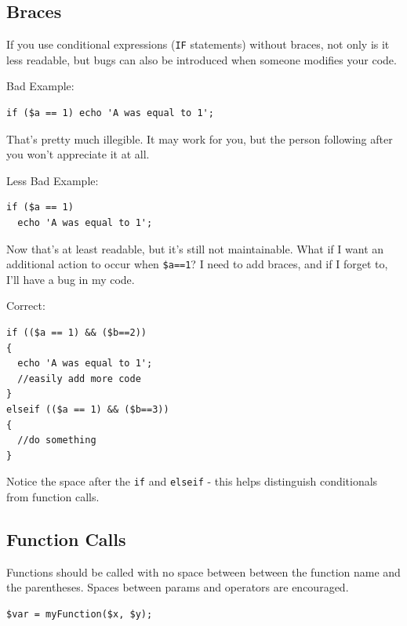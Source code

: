 \documentclass[headexclude,footexclude,12pt,BCOR0pt,DIV15]{scrartcl}
\begin{document}
    \subsection{Braces}
        If you use conditional expressions (\texttt{IF} statements) without braces, not only is it less readable,
        but bugs can also be introduced when someone modifies your code.
        \begin{description}
        \item{Bad Example:}
\begin{lstlisting}[stepnumber=0,frame={}]
if ($a == 1) echo 'A was equal to 1';
\end{lstlisting}

        That's pretty much illegible. It may work for you, but the person following after you won't appreciate it at all.

        \item{Less Bad Example:}
\begin{lstlisting}[stepnumber=0,frame={}]
if ($a == 1)
  echo 'A was equal to 1';
\end{lstlisting}

        Now that's at least readable, but it's still not maintainable. What if I want an additional action to occur when
        \texttt{\$a==1}? I need to add braces, and if I forget to, I'll have a bug in my code.

        \item{Correct:}
\begin{lstlisting}[stepnumber=0,frame={}]
if (($a == 1) && ($b==2))
{
  echo 'A was equal to 1';
  //easily add more code
}
elseif (($a == 1) && ($b==3))
{
  //do something
}
\end{lstlisting}

            Notice the space after the \texttt{if} and \texttt{elseif} - this helps distinguish conditionals from function calls.
        \end{description}

    \subsection{Function Calls}
        Functions should be called with no space between between the function name and the parentheses.
        Spaces between params and operators are encouraged.

\begin{lstlisting}[stepnumber=0,frame={}]
$var = myFunction($x, $y);
\end{lstlisting}
\end{document}
